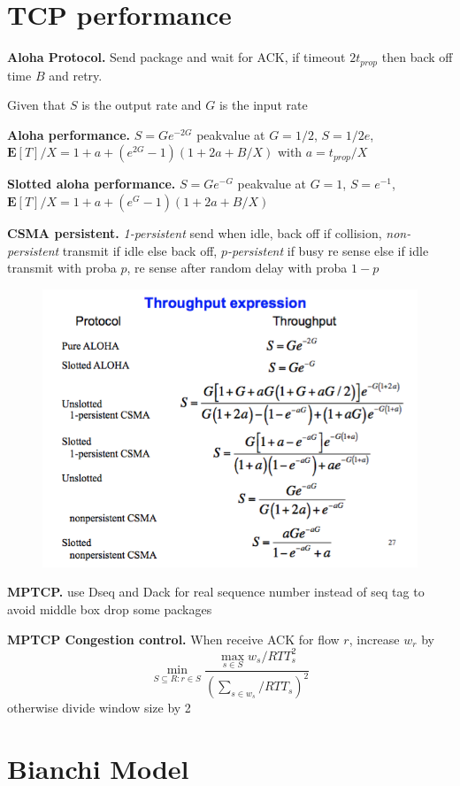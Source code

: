 \documentclass[10pt,twocolumn]{article}
\newcommand{\E}[1]{\mathbf{E}\l[#1\r]}
\renewcommand{\l}{\left}
\renewcommand{\r}{\right}
\renewcommand{\bf}{\textbf}
\begin{document}
\section{TCP performance}

\bf{Aloha Protocol.} Send package and wait for ACK, if timeout $2 t_{prop}$ then back off time $B$ and retry. 


Given that $S$ is the output rate and $G$ is the input rate

\bf{Aloha performance.} $S = Ge^{-2G}$ peakvalue at $G=1/2$, $S=1/2e$, $\E{T} / X = 1 + a + (e^{2G} - 1)(1 + 2a + B/X)$ with $a=t_{prop}/X$

\bf{Slotted aloha performance.} $S = Ge^{-G}$ peakvalue at $G=1$, $S=e^{-1}$, $\E{T} / X = 1 + a + (e^G - 1)(1 + 2a + B/X)$

\bf{CSMA persistent.} \emph{1-persistent} send when idle, back off if collision, \emph{non-persistent} transmit if idle else back off, \emph{$p$-persistent} if busy re sense else if idle transmit with proba $p$, re sense after random delay with proba $1-p$

\begin{figure}
  \centering
  \includegraphics[width=0.8\linewidth]{figures/throughput.png}
\end{figure}

\bf{MPTCP.} use Dseq and Dack for real sequence number instead of seq tag to avoid middle box drop some packages

\bf{MPTCP Congestion control.} When receive ACK for flow $r$, increase $w_r$ by 
\[
  \min_{S\subseteq R: r\in S} \frac{\max_{s\in S}w_s / RTT_s^2}{\l( \sum_{s\in w_s}/ RTT_s \r)^2}
\]
otherwise divide window size by 2

\section{Bianchi Model}
\end{document}
